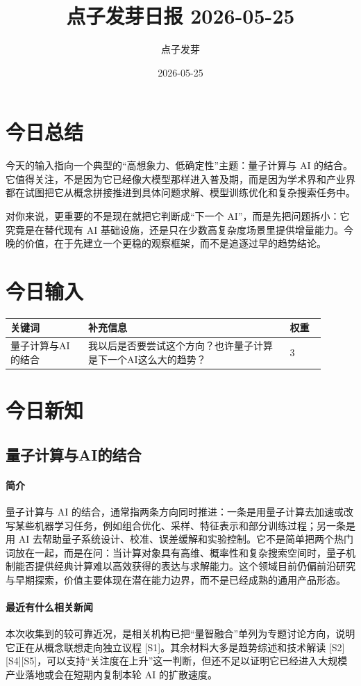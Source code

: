 \documentclass[UTF8,zihao=-4]{ctexart}
\title{\bfseries 点子发芽日报 2026-05-25}
\author{点子发芽}
\date{2026-05-25}
\begin{document}
\maketitle
\section*{今日总结}
今天的输入指向一个典型的“高想象力、低确定性”主题：量子计算与 AI 的结合。它值得关注，不是因为它已经像大模型那样进入普及期，而是因为学术界和产业界都在试图把它从概念拼接推进到具体问题求解、模型训练优化和复杂搜索任务中。

对你来说，更重要的不是现在就把它判断成“下一个 AI”，而是先把问题拆小：它究竟是在替代现有 AI 基础设施，还是只在少数高复杂度场景里提供增量能力。今晚的价值，在于先建立一个更稳的观察框架，而不是追逐过早的趋势结论。
\section*{今日输入}
\begin{longtable}{|p{0.22\linewidth}|p{0.58\linewidth}|p{0.10\linewidth}|}
\hline
\textbf{关键词} & \textbf{补充信息} & \textbf{权重} \\
\hline
量子计算与AI的结合 & 我以后是否要尝试这个方向？也许量子计算是下一个AI这么大的趋势？ & 3 \\
\hline
\end{longtable}
\section*{今日新知}
\subsection*{量子计算与AI的结合}
\paragraph{简介} 量子计算与 AI 的结合，通常指两条方向同时推进：一条是用量子计算去加速或改写某些机器学习任务，例如组合优化、采样、特征表示和部分训练过程；另一条是用 AI 去帮助量子系统设计、校准、误差缓解和实验控制。它不是简单把两个热门词放在一起，而是在问：当计算对象具有高维、概率性和复杂搜索空间时，量子机制能否提供经典计算难以高效获得的表达与求解能力。这个领域目前仍偏前沿研究与早期探索，价值主要体现在潜在能力边界，而不是已经成熟的通用产品形态。
\paragraph{最近有什么相关新闻} 本次收集到的较可靠近况，是相关机构已把“量智融合”单列为专题讨论方向，说明它正在从概念联想走向独立议程 [S1]。其余材料大多是趋势综述和技术解读 [S2][S4][S5]，可以支持“关注度在上升”这一判断，但还不足以证明它已经进入大规模产业落地或会在短期内复制本轮 AI 的扩散速度。
\end{document}
